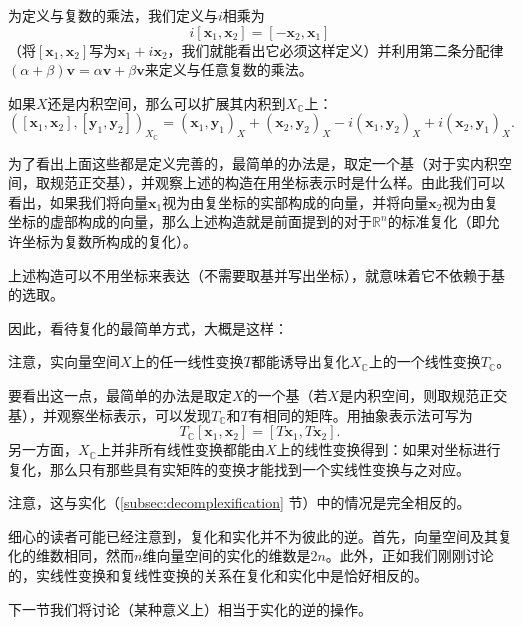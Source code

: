 为定义与复数的乘法，我们定义与$i$相乘为
\[i[\mathbf{x}_1,\mathbf{x}_2]=[-\mathbf{x}_2,\mathbf{x}_1]\]
（将$[\mathbf{x}_1,\mathbf{x}_2]$写为$\mathbf{x}_1+i\mathbf{x}_2$，我们就能看出它必须这样定义）并利用第二条分配律${(\alpha+\beta)}\mathbf{v}=\alpha\mathbf{v}+\beta\mathbf{v}$来定义与任意复数的乘法。

如果$X$还是内积空间，那么可以扩展其内积到$X_\mathbb{C}$上：
\[\left([\mathbf{x}_1,\mathbf{x}_2],[\mathbf{y}_1,\mathbf{y}_2]\right)_{X_{\mathbb{C}}}=\left(\mathbf{x}_1,\mathbf{y}_1\right)_X+\left(\mathbf{x}_2,\mathbf{y}_2\right)_X-i(\mathbf{x}_1,\mathbf{y}_2)_X+i(\mathbf{x}_2,\mathbf{y}_1)_X.\]

为了看出上面这些都是定义完善的，最简单的办法是，取定一个基（对于实内积空间，取规范正交基），并观察上述的构造在用坐标表示时是什么样。由此我们可以看出，如果我们将向量$\mathbf{x}_1$视为由复坐标的实部构成的向量，并将向量$\mathbf{x}_2$视为由复坐标的虚部构成的向量，那么上述构造就是前面提到的对于$\mathbb{R}^n$的标准复化（即允许坐标为复数所构成的复化）。

上述构造可以不用坐标来表达（不需要取基并写出坐标），就意味着它不依赖于基的选取。

因此，看待复化的最简单方式，大概是这样：
\begin{center}
\end{center}

注意，实向量空间$X$上的任一线性变换$T$都能诱导出复化$X_\mathbb{C}$上的一个线性变换$T_\mathbb{C}$。

要看出这一点，最简单的办法是取定$X$的一个基（若$X$是内积空间，则取规范正交基），并观察坐标表示，可以发现$T_\mathbb{C}$和$T$有相同的矩阵。用抽象表示法可写为
\[T_\mathbb{C}[\mathbf{x}_1,\mathbf{x}_2]=[T\mathbf{x}_1,T\mathbf{x}_2].\]
另一方面，$X_\mathbb{C}$上并非所有线性变换都能由$X$上的线性变换得到：如果对坐标进行复化，那么只有那些具有实矩阵的变换才能找到一个实线性变换与之对应。

注意，这与实化（\ref{subsec:decomplexification} 节）中的情况是完全相反的。

细心的读者可能已经注意到，复化和实化并不为彼此的逆。首先，向量空间及其复化的维数相同，然而$n$维向量空间的实化的维数是$2n$。此外，正如我们刚刚讨论的，实线性变换和复线性变换的关系在复化和实化中是恰好相反的。

下一节我们将讨论（某种意义上）相当于实化的逆的操作。

